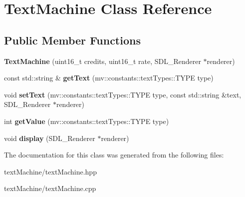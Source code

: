 \hypertarget{class_text_machine}{}\section{Text\+Machine Class Reference}
\label{class_text_machine}
\subsection*{Public Member Functions}
\begin{DoxyCompactItemize}
\item 
\mbox{\label{class_text_machine_af3056785151e546f5b6c57157dd24a29}} 
{\bfseries Text\+Machine} (uint16\+\_\+t credits, uint16\+\_\+t rate, S\+D\+L\+\_\+\+Renderer $\ast$renderer)
\item 
\mbox{\label{class_text_machine_a82f1e99a1e26b2cc47f9aa17c31d1d30}} 
const std\+::string \& {\bfseries get\+Text} (mv\+::constants\+::text\+Types\+::\+T\+Y\+PE type)
\item 
\mbox{\label{class_text_machine_a0f1f656364927e648a08985a8f2f5056}} 
void {\bfseries set\+Text} (mv\+::constants\+::text\+Types\+::\+T\+Y\+PE type, const std\+::string \&text, S\+D\+L\+\_\+\+Renderer $\ast$renderer)
\item 
\mbox{\label{class_text_machine_a2ca1a3539231f51a30c5878c3a3e2b01}} 
int {\bfseries get\+Value} (mv\+::constants\+::text\+Types\+::\+T\+Y\+PE type)
\item 
\mbox{\label{class_text_machine_a9699b1b3d032e021626aff01748a91d6}} 
void {\bfseries display} (S\+D\+L\+\_\+\+Renderer $\ast$renderer)
\end{DoxyCompactItemize}


The documentation for this class was generated from the following files\+:\begin{DoxyCompactItemize}
\item 
text\+Machine/text\+Machine.\+hpp\item 
text\+Machine/text\+Machine.\+cpp\end{DoxyCompactItemize}
